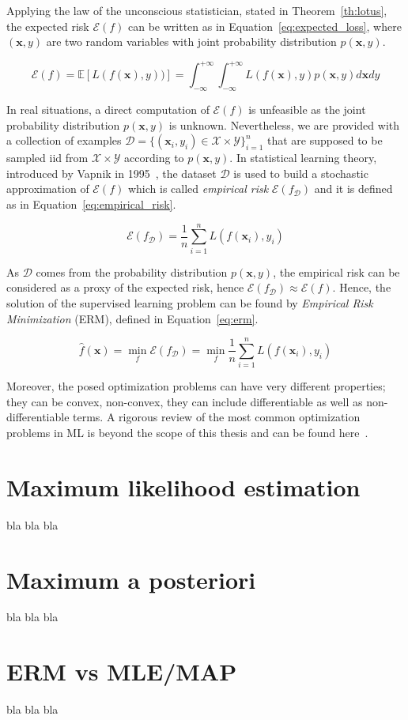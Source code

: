 Applying the law of the unconscious statistician, stated in Theorem~\ref{th:lotus}, the expected risk $\mathcal{E}(f)$ can be written as in Equation~\eqref{eq:expected_loss}, where $(\bm{x},y)$ are two random variables with joint probability distribution $p(\bm{x},y)$.

\begin{equation} \label{eq:expected_loss}
	\mathcal{E}(f) = \mathbb{E}[L(f(\bm{x}),y))] = \int_{-\infty}^{+\infty}\int_{-\infty}^{+\infty} L(f(\bm{x}),y) p(\bm{x},y) d\bm{x}dy
\end{equation}

In real situations, a direct computation of $\mathcal{E}(f)$ is unfeasible as the joint probability distribution $p(\bm{x},y)$ is unknown. Nevertheless, we are provided with a collection of examples $\mathcal{D}=\{(\bm{x}_i,y_i) \in \mathcal{X} \times \mathcal{Y}\}_{i=1}^n$ that are supposed to be sampled \ac{iid} from $\mathcal{X} \times \mathcal{Y}$ according to $p(\bm{x}, y)$.
In statistical learning theory, introduced by Vapnik in 1995~\cite{vapnik2013nature}, the dataset $\mathcal{D}$ is used to build a stochastic approximation of $\mathcal{E}(f)$ which is called \textit{empirical risk} $\mathcal{E}(f_{\mathcal{D}})$ and it is defined as in Equation~\eqref{eq:empirical_risk}.

\begin{equation} \label{eq:empirical_risk}
	\mathcal{E}(f_{\mathcal{D}}) = \frac{1}{n} \sum_{i=1}^{n} L(f(\bm{x}_i), y_i)
\end{equation}

As $\mathcal{D}$ comes from the probability distribution $p(\bm{x},y)$, the empirical risk can be considered as a proxy of the expected risk, hence $\mathcal{E}(f_{\mathcal{D}}) \approx \mathcal{E}(f)$. Hence, the solution of the supervised learning problem can be found by \textit{Empirical Risk Minimization} (ERM), defined in Equation~\eqref{eq:erm}.

\begin{equation} \label{eq:erm}
	\hat f(\bm{x}) = \min_f{\mathcal{E}(f_{\mathcal{D}})} = \min_f{\frac{1}{n} \sum_{i=1}^{n} L(f(\bm{x}_i), y_i)}
\end{equation}

 

Moreover, the posed optimization problems can have very different properties; they can be convex, non-convex, they can include differentiable as well as non-differentiable terms. A rigorous review of the most common optimization problems in ML is beyond the scope of this thesis and can be found here~\cite{boyd2004convex, bach2012optimization, sra2012optimization, nesterov2013introductory}.


\section{Maximum likelihood estimation} \label{sec:mle}
bla bla bla

\section{Maximum a posteriori} \label{sec:map}
bla bla bla

\section{ERM vs MLE/MAP} \label{sec:erm-mlemap_connection}
bla bla bla